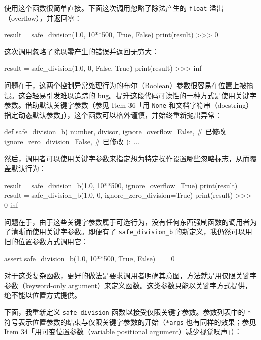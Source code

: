 使用这个函数很简单直接。下面这次调用忽略了除法产生的 \texttt{float} 溢出（overflow），并返回零：

\begin{codebox}[python]
result = safe_division(1.0, 10**500, True, False)
print(result)
>>>
0
\end{codebox}

这次调用忽略了除以零产生的错误并返回无穷大：

\begin{codebox}[python]
result = safe_division(1.0, 0, False, True)
print(result)
>>>
inf
\end{codebox}

问题在于，这两个控制异常处理行为的布尔（Boolean）参数很容易在位置上被搞混。这会轻易引发难以追踪的 bug。提升这段代码可读性的一种方式是使用关键字参数。借助默认关键字参数（参见 Item 36「用 \texttt{None} 和文档字符串（docstring）指定动态默认参数」），这个函数可以格外谨慎，并始终重新抛出异常：

\begin{codebox}[python]
def safe_division_b(
    number,
    divisor,
    ignore_overflow=False,       # 已修改
    ignore_zero_division=False,  # 已修改
):
    ...
\end{codebox}

然后，调用者可以使用关键字参数来指定想为特定操作设置哪些忽略标志，从而覆盖默认行为：

\begin{codebox}[python]
result = safe_division_b(1.0, 10**500, ignore_overflow=True)
print(result)
result = safe_division_b(1.0, 0, ignore_zero_division=True)
print(result)
>>>
0
inf
\end{codebox}

问题在于，由于这些关键字参数属于可选行为，没有任何东西强制函数的调用者为了清晰而使用关键字参数。即便有了 \texttt{safe\_division\_b} 的新定义，我仍然可以用旧的位置参数方式调用它：

\begin{codebox}[python]
assert safe_division_b(1.0, 10**500, True, False) == 0
\end{codebox}

对于这类复杂函数，更好的做法是要求调用者明确其意图，方法就是用仅限关键字参数（keyword-only argument）来定义函数。这类参数只能以关键字方式提供，绝不能以位置方式提供。

下面，我重新定义 \texttt{safe\_division} 函数以接受仅限关键字参数。参数列表中的 \texttt{*} 符号表示位置参数的结束与仅限关键字参数的开始（\texttt{*args} 也有同样的效果；参见 Item 34「用可变位置参数（variable positional argument）减少视觉噪声」）：

